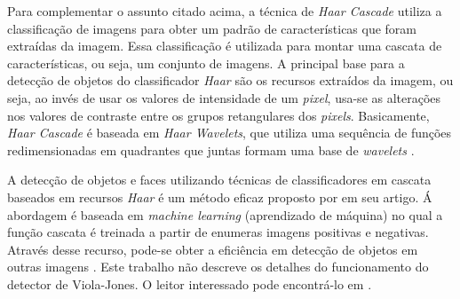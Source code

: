 
Para complementar o assunto citado acima, a técnica de \textit{Haar Cascade} utiliza a classificação de imagens para obter um padrão de características que foram extraídas da imagem. Essa classificação é utilizada para montar uma cascata de características, ou seja, um conjunto de imagens. A principal base para a detecção de objetos do classificador \textit{Haar} são os recursos extraídos da imagem, ou seja, ao invés de usar os valores de intensidade de um \textit{pixel}, usa-se as alterações nos valores de contraste entre os grupos retangulares dos \textit{pixels}. Basicamente, \textit{Haar Cascade} é baseada em \textit{Haar Wavelets}, que utiliza uma sequência de funções redimensionadas em quadrantes que juntas formam uma base de \textit{wavelets} \cite{WILSON2006}.

A detecção de objetos e faces utilizando técnicas de classificadores em cascata baseados em recursos \textit{Haar} é um método eficaz proposto por  em seu artigo. Á abordagem é baseada em \textit{machine learning} (aprendizado de máquina) no qual a função cascata é treinada a partir de enumeras imagens positivas e negativas. Através desse recurso, pode-se obter a eficiência em detecção de objetos em outras imagens \cite{OpenCV}. Este trabalho não descreve os detalhes do funcionamento do detector de Viola-Jones. O leitor interessado pode encontrá-lo em \cite{VIOLA2001}.